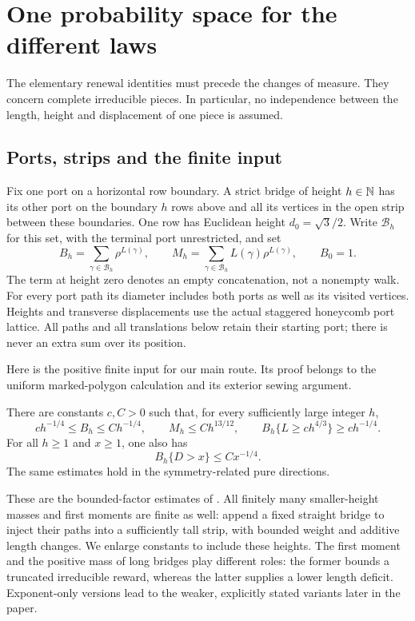 \section{One probability space for the different laws}\label{R:sec:renewal}
The elementary renewal identities must precede the changes of measure. They concern complete irreducible pieces. In particular, no independence between the length, height and displacement of one piece is assumed.

\subsection{Ports, strips and the finite input}
Fix one port on a horizontal row boundary. A strict bridge of height $h\in\mathbb N$ has its other port on the boundary $h$ rows above and all its vertices in the open strip between these boundaries. One row has Euclidean height $d_0=\sqrt3/2$. Write $\mathcal B_h$ for this set, with the terminal port unrestricted, and set
\[
 B_h=\sum_{\gamma\in\mathcal B_h}\rho^{L(\gamma)},\qquad
 M_h=\sum_{\gamma\in\mathcal B_h}L(\gamma)\rho^{L(\gamma)},\qquad B_0=1.
\]
The term at height zero denotes an empty concatenation, not a nonempty walk. For every port path its diameter includes both ports as well as its visited vertices. Heights and transverse displacements use the actual staggered honeycomb port lattice. All paths and all translations below retain their starting port; there is never an extra sum over its position.

Here is the positive finite input for our main route. Its proof belongs to the uniform marked-polygon calculation and its exterior sewing argument.
\begin{theorem}\label{R:renew:finite-input}
There are constants $c,C>0$ such that, for every sufficiently large integer $h$,
\[
 c h^{-1/4}\le B_h\le C h^{-1/4},\qquad M_h\le C h^{13/12},\qquad
 B_h\{L\ge c h^{4/3}\}\ge c h^{-1/4}.
\]
For all $h\ge1$ and $x\ge1$, one also has
\[
 B_h\{D>x\}\le C x^{-1/4}.
\]
The same estimates hold in the symmetry-related pure directions.
\end{theorem}
These are the bounded-factor estimates of \cite[Theorem~1.1]{companionU}. All finitely many smaller-height masses and first moments are finite as well: append a fixed straight bridge to inject their paths into a sufficiently tall strip, with bounded weight and additive length changes. We enlarge constants to include these heights. The first moment and the positive mass of long bridges play different roles: the former bounds a truncated irreducible reward, whereas the latter supplies a lower length deficit. Exponent-only versions lead to the weaker, explicitly stated variants later in the paper.

